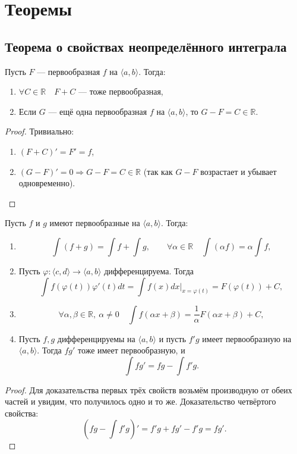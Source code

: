 \section{Теоремы}

\subsection{Теорема о свойствах неопределённого интеграла}

\begin{theorem} \hypertarget{t1_1}{}
	Пусть $F$ --- первообразная $f$ на $\langle a, b \rangle$. Тогда:
	\begin{enumerate}
		\item $\forall C \in \mathbb{R} \quad F + C$ --- тоже первообразная,
		\item Если $G$ --- ещё одна первообразная $f$ на $\langle a, b \rangle$, то $G - F = C \in \mathbb{R}$.
	\end{enumerate}
\end{theorem}
\begin{proof}
	Тривиально:
	\begin{enumerate}
		\item $(F + C)' = F' = f$,
		\item $(G - F)' = 0 \Rightarrow G - F = C \in \mathbb{R}$ (так как $G - F$ возрастает и убывает одновременно).
	\end{enumerate}
\end{proof}

\begin{theorem} \hypertarget{t1_2}{}
	Пусть $f$ и $g$ имеют первообразные на $\langle a, b \rangle$. Тогда:
	\begin{enumerate}
		\item \[
			\int (f + g) = \int f + \int g, \qquad \forall \alpha \in \mathbb{R} \quad \int (\alpha f) = \alpha \int f,
		\]
		\item Пусть $\varphi \colon \langle c, d \rangle \to \langle a, b \rangle$ дифференцируема. Тогда \[
			\int f(\varphi(t)) \varphi'(t) dt = \int f(x) dx \bigg|_{x = \varphi(t)} = F(\varphi(t)) + C,
		\]
		\item \[
			\forall \alpha, \beta \in \mathbb{R}, \ \alpha \neq 0 \quad \int f(\alpha x + \beta) = \frac1\alpha F(\alpha x + \beta) + C,
		\]
		\item Пусть $f, g$ дифференцируемы на $\langle a, b \rangle$ и пусть $f'g$ имеет первообразную на $\langle a, b \rangle$.
		Тогда $fg'$ тоже имеет первообразную, и \[
			\int fg' = fg - \int f'g.
		\]
	\end{enumerate}
\end{theorem}
\begin{proof}
		Для доказательства первых трёх свойств возьмём производную от обеих частей и увидим, что получилось одно и то же.
		Доказательство четвёртого свойства: \[
		\left( fg - \int f'g \right)' = f'g + fg' - f'g = fg'.
		\]
\end{proof}

